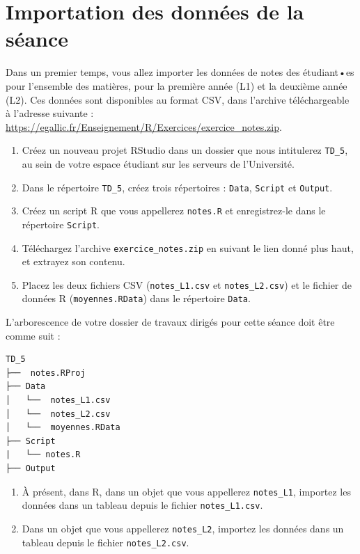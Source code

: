 \documentclass[
  11pt,
]{book}
\providecommand{\tightlist}{%
  \setlength{\itemsep}{0pt}\setlength{\parskip}{0pt}}
\numberwithin{equation}{section}
\numberwithin{countremarque}{section}
\newenvironment{greenbox}{
  \begin{tcolorbox}[breakable, colback=vert,coltext=black,
                  colframe=grisfonce]}
 {\end{tcolorbox}}
\begin{document}
\hypertarget{importation-des-donnuxe9es-de-la-suxe9ance}{%
\section{Importation des données de la séance}\label{importation-des-donnuxe9es-de-la-suxe9ance}}

Dans un premier temps, vous allez importer les données de notes des étudiant•es pour l'ensemble des matières, pour la première année (L1) et la deuxième année (L2). Ces données sont disponibles au format CSV, dans l'archive téléchargeable à l'adresse suivante : \url{https://egallic.fr/Enseignement/R/Exercices/exercice_notes.zip}.

\begin{greenbox}

\begin{enumerate}
\def\labelenumi{\arabic{enumi}.}
\tightlist
\item
  Créez un nouveau projet RStudio dans un dossier que nous intitulerez \texttt{TD\_5}, au sein de votre espace étudiant sur les serveurs de l'Université.
\item
  Dans le répertoire \texttt{TD\_5}, créez trois répertoires : \texttt{Data}, \texttt{Script} et \texttt{Output}.
\item
  Créez un script R que vous appellerez \texttt{notes.R} et enregistrez-le dans le répertoire \texttt{Script}.
\item
  Téléchargez l'archive \texttt{exercice\_notes.zip} en suivant le lien donné plus haut, et extrayez son contenu.
\item
  Placez les deux fichiers CSV (\texttt{notes\_L1.csv} et \texttt{notes\_L2.csv}) et le fichier de données R (\texttt{moyennes.RData}) dans le répertoire \texttt{Data}.
\end{enumerate}

L'arborescence de votre dossier de travaux dirigés pour cette séance doit être comme suit :

\begin{lstlisting}
TD_5
├──  notes.RProj
├── Data
│   └──  notes_L1.csv
│   └──  notes_L2.csv
│   └──  moyennes.RData
├── Script
|   └── notes.R
├── Output
\end{lstlisting}

\begin{enumerate}
\def\labelenumi{\arabic{enumi}.}
\setcounter{enumi}{5}
\tightlist
\item
  À présent, dans R, dans un objet que vous appellerez \texttt{notes\_L1}, importez les données dans un tableau depuis le fichier \texttt{notes\_L1.csv}.
\item
  Dans un objet que vous appellerez \texttt{notes\_L2}, importez les données dans un tableau depuis le fichier \texttt{notes\_L2.csv}.
\end{enumerate}

\end{greenbox}
\end{document}
